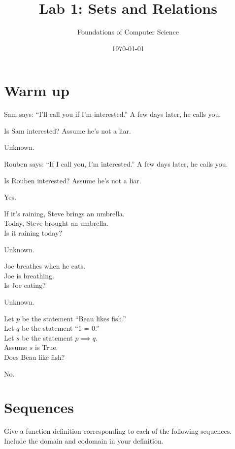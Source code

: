 \documentclass[]{exam}
\title{Lab 1: Sets and Relations}
\author{Foundations of Computer Science}
\date{\today}
\begin{document}
\maketitle

\begin{questions}

\section*{Warm up}
\question
Sam says: ``I'll call you if I'm interested.'' A few days later, he calls you.

Is Sam interested? Assume he's not a liar.

\begin{solution}
Unknown.
\end{solution}

\question
Rouben says: ``If I call you, I'm interested.'' A few days later, he calls you.

Is Rouben interested? Assume he's not a liar.

\begin{solution}
Yes.
\end{solution}


\question If it's raining, Steve brings an umbrella.\\
    Today, Steve brought an umbrella.\\
    Is it raining today?

\begin{solution}
Unknown.
\end{solution}


\question Joe breathes when he eats.\\
    Joe is breathing.\\
    Is Joe eating?
\begin{solution}
Unknown.
\end{solution}


\question Let $p$ be the statement ``Beau likes fish.''\\
    Let $q$ be the statement ``1 = 0.''\\
    Let $s$ be the statement $p \implies q$.\\
    Assume $s$ is True.\\
    Does Beau like fish?
\begin{solution}
No.
\end{solution}

\section*{Sequences}
\question
Give a function definition corresponding to each of the following sequences. Include the domain and codomain in your definition.


\end{questions}
\end{document}
